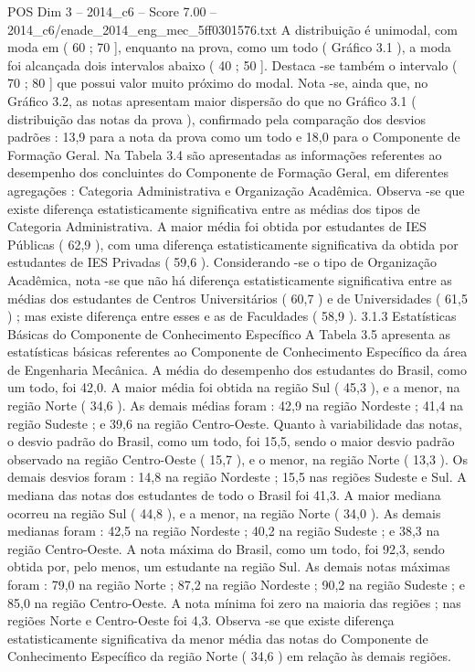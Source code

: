 \begin{textsample}{POS Dim 3 – 2014\_c6 – Score 7.00 – 2014\_c6/enade\_2014\_eng\_mec\_5ff0301576.txt}
A distribuição é unimodal, com moda em ( 60 ; 70 ], enquanto na prova, como um todo ( Gráfico 3.1 ), a moda foi alcançada dois intervalos abaixo ( 40 ; 50 ].
Destaca -se também o intervalo ( 70 ; 80 ] que possui valor muito próximo do modal.
Nota -se, ainda que, no Gráfico 3.2, as notas apresentam maior dispersão do que no Gráfico 3.1 ( distribuição das notas da prova ), confirmado pela comparação dos desvios padrões : 13,9 para a nota da prova como um todo e 18,0 para o Componente de Formação Geral.
Na Tabela 3.4 são apresentadas as informações referentes ao desempenho dos concluintes do Componente de Formação Geral, em diferentes agregações : Categoria Administrativa e Organização Acadêmica.
Observa -se que existe diferença estatisticamente significativa entre as médias dos tipos de Categoria Administrativa.
A maior média foi obtida por estudantes de IES Públicas ( 62,9 ), com uma diferença estatisticamente significativa da obtida por estudantes de IES Privadas ( 59,6 ).
Considerando -se o tipo de Organização Acadêmica, nota -se que não há diferença estatisticamente significativa entre as médias dos estudantes de Centros Universitários ( 60,7 ) e de Universidades ( 61,5 ) ; mas existe diferença entre esses e as de Faculdades ( 58,9 ). 3.1.3 Estatísticas Básicas do Componente de Conhecimento Específico A Tabela 3.5 apresenta as estatísticas básicas referentes ao Componente de Conhecimento Específico da área de Engenharia Mecânica.
A média do desempenho dos estudantes do Brasil, como um todo, foi 42,0.
A maior média foi obtida na região Sul ( 45,3 ), e a menor, na região Norte ( 34,6 ).
As demais médias foram : 42,9 na região Nordeste ; 41,4 na região Sudeste ; e 39,6 na região Centro-Oeste.
Quanto à variabilidade das notas, o desvio padrão do Brasil, como um todo, foi 15,5, sendo o maior desvio padrão observado na região Centro-Oeste ( 15,7 ), e o menor, na região Norte ( 13,3 ).
Os demais desvios foram : 14,8 na região Nordeste ; 15,5 nas regiões Sudeste e Sul.
A mediana das notas dos estudantes de todo o Brasil foi 41,3.
A maior mediana ocorreu na região Sul ( 44,8 ), e a menor, na região Norte ( 34,0 ).
As demais medianas foram : 42,5 na região Nordeste ; 40,2 na região Sudeste ; e 38,3 na região Centro-Oeste.
A nota máxima do Brasil, como um todo, foi 92,3, sendo obtida por, pelo menos, um estudante na região Sul.
As demais notas máximas foram : 79,0 na região Norte ; 87,2 na região Nordeste ; 90,2 na região Sudeste ; e 85,0 na região Centro-Oeste.
A nota mínima foi zero na maioria das regiões ; nas regiões Norte e Centro-Oeste foi 4,3.
Observa -se que existe diferença estatisticamente significativa da menor média das notas do Componente de Conhecimento Específico da região Norte ( 34,6 ) em relação às demais regiões.

\end{textsample}
